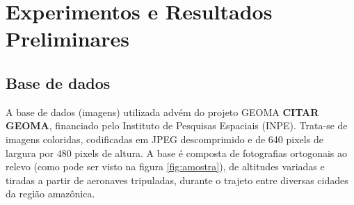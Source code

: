 \chapter{Experimentos e Resultados Preliminares}

\section{Base de dados}

A base de dados (imagens) utilizada advém do projeto GEOMA \textbf{CITAR GEOMA}, financiado pelo Instituto de Pesquisas Espaciais (INPE). Trata-se de imagens coloridas, codificadas em JPEG descomprimido e de 640 pixels de largura por 480 pixels de altura. A base é composta de fotografias ortogonais ao relevo (como pode ser visto na figura \ref{fig:amostra}), de altitudes variadas e tiradas a partir de aeronaves tripuladas, durante o trajeto entre diversas cidades da região amazônica.

